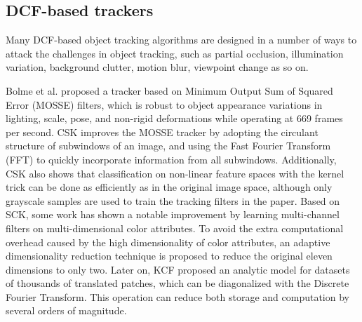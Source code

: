 \documentclass[review]{elsarticle}
\begin{document}
\begin{CJK*}{UTF8}{gbsn}
\subsection{DCF-based trackers}
Many DCF-based object tracking algorithms are designed in a number of ways to attack the challenges in object tracking, such as partial occlusion, illumination variation, background clutter, motion blur, viewpoint change as so on.

Bolme et al. proposed a tracker \cite{Bolme2010VisualOT} based on Minimum Output Sum of Squared Error (MOSSE) filters, which is robust to object appearance variations in lighting, scale, pose, and non-rigid deformations while operating at 669 frames per second.
CSK \cite{Henriques2012ExploitingTC} improves the MOSSE tracker by adopting the circulant structure of subwindows of an image, and using the Fast Fourier Transform (FFT) to quickly incorporate information from all subwindows. Additionally, CSK also shows that classification on non-linear feature spaces with the kernel trick can be done as efficiently as in the original image space, although only grayscale samples are used to train the tracking filters in the paper.
Based on SCK, some work \cite{Danelljan2014AdaptiveCA} has shown a notable improvement by learning multi-channel filters on multi-dimensional color attributes. To avoid the extra computational overhead caused by the high dimensionality of color attributes,  an adaptive dimensionality reduction technique is proposed \cite{Danelljan2014AdaptiveCA} to reduce the original eleven dimensions to only two.
Later on, KCF \cite{Henriques2015HighSpeedTW} proposed an analytic model for datasets of thousands of translated patches, which can be diagonalized with the Discrete Fourier Transform. This operation can reduce both storage and computation by several orders of magnitude.


\end{CJK*}
\end{document}
